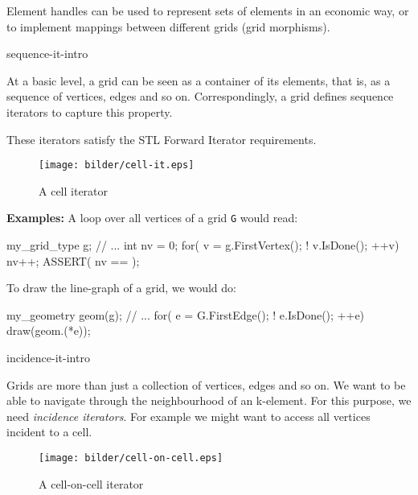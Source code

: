    Element handles can be used to represent sets of elements in an economic way,
   or to implement mappings between different grids (grid morphisms).

   \begin{Label}{sequence-it-intro}
   \end{Label}
   At a basic level, a grid can be seen as a container of its elements, that is,
   as a sequence of vertices, edges and so on. Correspondingly, a grid defines
   sequence iterators 
   to capture this property.

   These iterators satisfy the STL Forward Iterator requirements.

   \begin{figure}[h]
     \begin{center}
       \T\texttt{[image: bilder/cell-it.eps]}
       \W{}
       \caption{A cell iterator}
     \end{center}
   \end{figure}

   {\bf Examples:} 
   A loop over all vertices of a grid {\tt G} would read:
   \begin{example}
       my_grid_type g;
       // ...
       int nv = 0;
       for( v = g.FirstVertex(); ! v.IsDone(); ++v)
         nv++;
       ASSERT( nv ==  );
\end{example}
      To draw the line-graph of a grid, we would do:

\begin{example}
       my_geometry geom(g);
       // ...
       for( e = G.FirstEdge(); ! e.IsDone(); ++e)
         draw(geom.(*e));
\end{example}

\begin{Label}{incidence-it-intro}
    \end{Label}
    Grids are more than just a collection of vertices, edges and so
    on. We want to be able to navigate through the neighbourhood of an k-element.
    For this purpose, we need {\em incidence iterators\/}. 
    For example we might want
    to access all vertices incident to a cell.

   \begin{figure}[h]
     \begin{center}
       \T\texttt{[image: bilder/cell-on-cell.eps]}
       \W{}
      \caption{A cell-on-cell iterator}
     \end{center}
   \end{figure}

